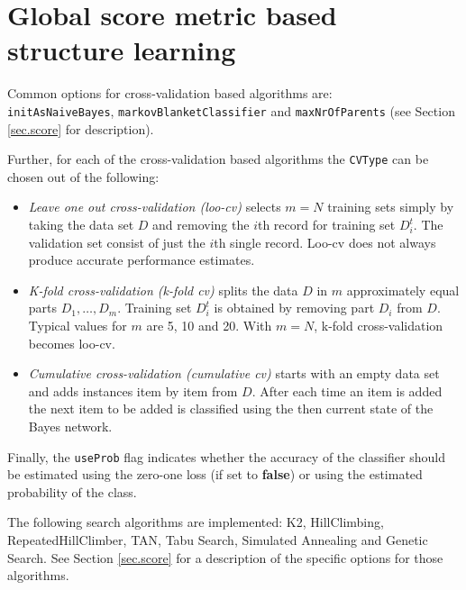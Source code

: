 \documentclass[a4paper]{article}
\begin{document}
\section{Global score metric based structure learning}

\begin{center}
\end{center}

Common options for cross-validation based algorithms are: \\
{\tt initAsNaiveBayes}, {\tt markovBlanketClassifier} and {\tt maxNrOfParents}
(see Section \ref{sec.score} for description).

Further, for each of the cross-validation based algorithms the {\tt CVType} can be
chosen out of the following:

\begin{itemize}
\item {\em Leave one out cross-validation (loo-cv)} selects $m=N$ training sets 
simply by taking the data set $D$ and removing the $i$th record for training 
set $D_i^t$. The validation set consist of just the $i$th single record. 
Loo-cv does not always produce accurate performance estimates. 

\item {\em K-fold cross-validation (k-fold cv)} splits the data $D$ in $m$ approximately 
equal parts $D_1,\ldots,D_m$. Training set $D_i^t$ is obtained by removing part 
$D_i$ from $D$. Typical values for $m$ are 5, 10 and 20. With $m=N$, k-fold cross-validation becomes loo-cv. 

\item {\em Cumulative cross-validation (cumulative cv)} starts with an empty data
set and adds instances item by item from $D$. After each time an item is added
the next item to be added is classified using the then current state of the
Bayes network.
\end{itemize}

Finally, the {\tt useProb} flag indicates whether the accuracy of the classifier
should be estimated using the zero-one loss (if set to {\bf false}) or using
the estimated probability of the class.

\begin{center}
\end{center}

The following search algorithms are implemented: K2, HillClimbing, RepeatedHillClimber,
TAN, Tabu Search, Simulated Annealing and Genetic Search. See Section \ref{sec.score} for
a description of the specific options for those algorithms.
\end{document}
